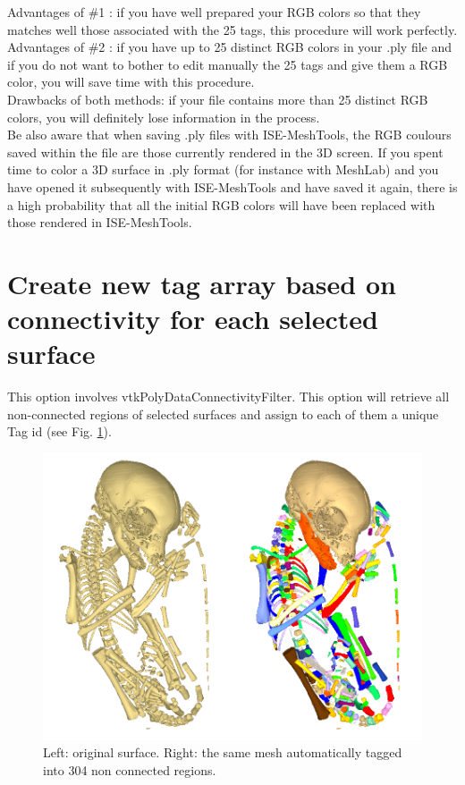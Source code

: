 Advantages of \#1 : if you have well prepared your RGB colors so that they matches well those associated with the 25 tags, this procedure will work perfectly.\\
Advantages of \#2 : if you have up to 25 distinct RGB colors in your .ply file and if you do not want to bother to edit manually the 25 tags and give them a RGB color, you will save time with this procedure. 
\\Drawbacks of both methods: if your file contains more than 25 distinct RGB colors, you will definitely lose information in the process.
\\Be also aware that when saving .ply files with ISE-MeshTools, the RGB coulours saved within the file are those currently rendered in the 3D screen. If you spent time to color a 3D surface in .ply format (for instance with MeshLab) and you have opened it subsequently with ISE-MeshTools and have saved it again, there is a high probability that all the initial RGB colors will have been replaced with those rendered in ISE-MeshTools.


\section{Create new tag array based on connectivity for each selected surface}

This option involves vtkPolyDataConnectivityFilter. This option will retrieve all non-connected regions of selected surfaces and assign to each of them a unique Tag id (see Fig. \ref{tag_connected}).
\begin{figure}
  \centering
  \includegraphics[scale=0.45]{images/Tags/Lemur_tag_input_output.png} 
	\caption{Left: original surface. Right: the same mesh automatically tagged into 304 non connected regions.}
\label{tag_connected}
 
\end{figure}


